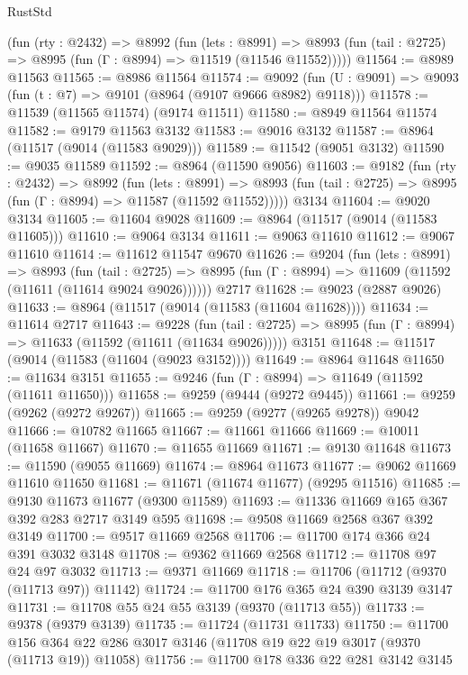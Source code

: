 \begin{lexlean}{RustStd}
\begin{coremodule}
    (fun (rty : @2432) =>
    @8992
      (fun (lets : @8991) =>
      @8993 (fun (tail : @2725) => @8995 (fun (Γ : @8994) => @11519 (@11546 @11552)))))
@11564 := @8989 @11563
@11565 := @8986 @11564
@11574 := @9092 (fun (U : @9091) => @9093 (fun (t : @7) => @9101 (@8964 (@9107 @9666 @8982) @9118)))
@11578 := @11539 (@11565 @11574) (@9174 @11511)
@11580 := @8949 @11564 @11574
@11582 := @9179 @11563 @3132
@11583 := @9016 @3132
@11587 := @8964 (@11517 (@9014 (@11583 @9029)))
@11589 := @11542 (@9051 @3132)
@11590 := @9035 @11589
@11592 := @8964 (@11590 @9056)
@11603 := @9182
    (fun (rty : @2432) =>
    @8992
      (fun (lets : @8991) =>
      @8993 (fun (tail : @2725) => @8995 (fun (Γ : @8994) => @11587 (@11592 @11552)))))
    @3134
@11604 := @9020 @3134
@11605 := @11604 @9028
@11609 := @8964 (@11517 (@9014 (@11583 @11605)))
@11610 := @9064 @3134
@11611 := @9063 @11610
@11612 := @9067 @11610
@11614 := @11612 @11547 @9670
@11626 := @9204
    (fun (lets : @8991) =>
    @8993
      (fun (tail : @2725) =>
      @8995 (fun (Γ : @8994) => @11609 (@11592 (@11611 (@11614 @9024 @9026))))))
    @2717
@11628 := @9023 (@2887 @9026)
@11633 := @8964 (@11517 (@9014 (@11583 (@11604 @11628))))
@11634 := @11614 @2717
@11643 := @9228
    (fun (tail : @2725) => @8995 (fun (Γ : @8994) => @11633 (@11592 (@11611 (@11634 @9026)))))
    @3151
@11648 := @11517 (@9014 (@11583 (@11604 (@9023 @3152))))
@11649 := @8964 @11648
@11650 := @11634 @3151
@11655 := @9246 (fun (Γ : @8994) => @11649 (@11592 (@11611 @11650)))
@11658 := @9259 (@9444 (@9272 @9445))
@11661 := @9259 (@9262 (@9272 @9267))
@11665 := @9259 (@9277 (@9265 @9278)) @9042
@11666 := @10782 @11665
@11667 := @11661 @11666
@11669 := @10011 (@11658 @11667)
@11670 := @11655 @11669
@11671 := @9130 @11648
@11673 := @11590 (@9055 @11669)
@11674 := @8964 @11673
@11677 := @9062 @11669 @11610 @11650
@11681 := @11671 (@11674 @11677) (@9295 @11516)
@11685 := @9130 @11673 @11677 (@9300 @11589)
@11693 := @11336 @11669 @165 @367 @392 @283 @2717 @3149 @595
@11698 := @9508 @11669 @2568 @367 @392 @3149
@11700 := @9517 @11669 @2568
@11706 := @11700 @174 @366 @24 @391 @3032 @3148
@11708 := @9362 @11669 @2568
@11712 := @11708 @97 @24 @97 @3032
@11713 := @9371 @11669
@11718 := @11706 (@11712 (@9370 (@11713 @97)) @11142)
@11724 := @11700 @176 @365 @24 @390 @3139 @3147
@11731 := @11708 @55 @24 @55 @3139 (@9370 (@11713 @55))
@11733 := @9378 (@9379 @3139)
@11735 := @11724 (@11731 @11733)
@11750 := @11700
    @156
    @364
    @22
    @286
    @3017
    @3146
    (@11708 @19 @22 @19 @3017 (@9370 (@11713 @19)) @11058)
@11756 := @11700 @178 @336 @22 @281 @3142 @3145

\end{coremodule}
\end{lexlean}
